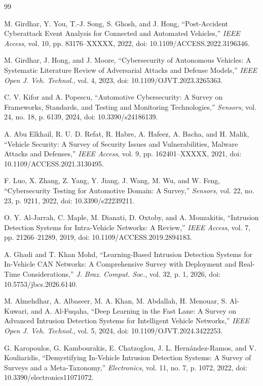 \documentclass[journal]{IEEEtran}
\begin{document}
	\begin{thebibliography}{99}
		
		 M. Girdhar, Y. You, T.-J. Song, S. Ghosh, and J. Hong,
		``Post-Accident Cyberattack Event Analysis for Connected and Automated
		Vehicles,'' \emph{IEEE Access}, vol. 10, pp. 83176--XXXXX, 2022, doi:
		10.1109/ACCESS.2022.3196346.
		
		 M. Girdhar, J. Hong, and J. Moore, ``Cybersecurity of
		Autonomous Vehicles: A Systematic Literature Review of Adversarial Attacks
		and Defense Models,'' \emph{IEEE Open J. Veh. Technol.}, vol. 4, 2023,
		doi: 10.1109/OJVT.2023.3265363.
		
		 C. V. Kifor and A. Popescu, ``Automotive Cybersecurity: A
		Survey on Frameworks, Standards, and Testing and Monitoring
		Technologies,'' \emph{Sensors}, vol. 24, no. 18, p. 6139, 2024, doi:
		10.3390/s24186139.
		
		 A. Abu Elkhail, R. U. D. Refat, R. Habre, A. Hafeez, A.
		Bacha, and H. Malik, ``Vehicle Security: A Survey of Security Issues and
		Vulnerabilities, Malware Attacks and Defenses,'' \emph{IEEE Access}, vol.
		9, pp. 162401--XXXXX, 2021, doi: 10.1109/ACCESS.2021.3130495.
		
		 F. Luo, X. Zhang, Z. Yang, Y. Jiang, J. Wang, M. Wu, and W.
		Feng, ``Cybersecurity Testing for Automotive Domain: A Survey,''
		\emph{Sensors}, vol. 22, no. 23, p. 9211, 2022, doi: 10.3390/s22239211.
		
		 O. Y. Al-Jarrah, C. Maple, M. Dianati, D. Oxtoby, and A.
		Mouzakitis, ``Intrusion Detection Systems for Intra-Vehicle Networks: A
		Review,'' \emph{IEEE Access}, vol. 7, pp. 21266--21289, 2019, doi:
		10.1109/ACCESS.2019.2894183.
		
		 A. Ghadi and T. Khan Mohd, ``Learning-Based Intrusion
		Detection Systems for In-Vehicle CAN Networks: A Comprehensive Survey with
		Deployment and Real-Time Considerations,'' \emph{J. Braz. Comput. Soc.},
		vol. 32, p. 1, 2026, doi: 10.5753/jbcs.2026.6140.
		
		 M. Almehdhar, A. Albaseer, M. A. Khan, M. Abdallah, H.
		Menouar, S. Al-Kuwari, and A. Al-Fuqaha, ``Deep Learning in the Fast Lane:
		A Survey on Advanced Intrusion Detection Systems for Intelligent Vehicle
		Networks,'' \emph{IEEE Open J. Veh. Technol.}, vol. 5, 2024, doi:
		10.1109/OJVT.2024.3422253.
		
		 G. Karopoulos, G. Kambourakis, E. Chatzoglou, J. L.
		Hern\'andez-Ramos, and V. Kouliaridis, ``Demystifying In-Vehicle Intrusion
		Detection Systems: A Survey of Surveys and a Meta-Taxonomy,''
		\emph{Electronics}, vol. 11, no. 7, p. 1072, 2022, doi:
		10.3390/electronics11071072.
		

\end{thebibliography}
\end{document}
